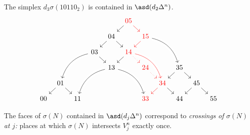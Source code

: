 \documentclass[main.tex]{subfiles}
\begin{document}
\begin{example}
  The simplex $d_{3} \sigma(10110_{2})$ is contained in $\asd(d_{2} \Delta^{n})$.
  \begin{equation*}
    \begin{tikzcd}[column sep=tiny, row sep=small]
      &&&&& \color{red}{05}
      \arrow[dl]
      \arrow[dr, color=red]
      \\
      &&&& 04
      \arrow[dl]
      \arrow[dr]
      && \color{red}{15}
      \arrow[ddrr, crossing over, bend left]
      \arrow[dl, color=red]
      \\
      &&& 03
      \arrow[ddll, crossing over, bend right]
      \arrow[dr]
      && \color{red}{14}
      \arrow[dl]
      \arrow[ddrr, crossing over, bend left, color=red]
      \arrow[dr, dotted, red]
      && \
      \\
      && \
      && 13
      \arrow[ddll, crossing over, bend right]
      \arrow[ddrr, crossing over, bend left]
      && \color{red}{24}
      \arrow[dr, dotted, red]
      && 35
      \arrow[dl]
      \arrow[dr]
      \\
      & 01
      \arrow[dl]
      \arrow[dr]
      && \
      && \
      && \color{red}{34}
      \arrow[dl, color=red]
      \arrow[dr]
      && 45
      \arrow[dl]
      \arrow[dr]
      \\
      00
      && 11
      && \
      && \color{red}{33}
      && 44
      && 55
    \end{tikzcd}
  \end{equation*}
\end{example}

The faces of $\sigma(N)$ contained in $\asd(d_{j} \Delta^{n})$ correspond to \emph{crossings of $\sigma(N)$ at $j$:} places at which $\sigma(N)$ intersects $V^{n}_{j}$ exactly once.
\end{document}
